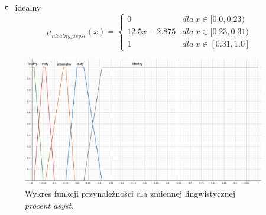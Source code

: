 \documentclass{classrep}
\begin{document}
\begin{enumerate}
\begin{itemize}
\begin{equation}
        \end{equation}
        \item idealny
        \begin{equation}
            \mu_{idealny\_asyst}(x) = \left\{\begin{matrix} 0 & dla \: x\in [0.0, 0.23) \\ 12.5x - 2.875 & dla \: x\in[0.23, 0.31) \\ 1 & dla \: x\in [0.31, 1.0] \end{matrix}\right.
        \end{equation}
    \end{itemize}
     \begin{figure}[H]
    \centering
    \includegraphics[width=14cm]{wykres_pr_asyst.png}
    \caption{Wykres funkcji przynależności dla zmiennej lingwistycznej \textit{procent asyst}.}
    \label{rysunek:procent_asyst}
\end{figure}
\end{enumerate}
\end{document}
